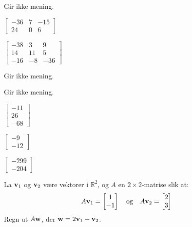 \begin{losning}

\begin{punkt}
Gir ikke mening.
\end{punkt}

\begin{punkt}
$\begin{bmatrix}
-36 & 7 & -15\\
24 & 0 & 6
\end{bmatrix}$
\end{punkt}

\begin{punkt}
$\begin{bmatrix}
-38 & 3 & 9\\
14 & 11 & 5\\
-16 & -8 & -36
\end{bmatrix}$
\end{punkt}

\begin{punkt}
Gir ikke mening.
\end{punkt}

\begin{punkt}
Gir ikke mening.
\end{punkt}

\begin{punkt}
$\begin{bmatrix}
-11\\
26\\
-68
\end{bmatrix}$
\end{punkt}


\begin{punkt}
$\begin{bmatrix}
-9\\
-12
\end{bmatrix}$
\end{punkt}


\begin{punkt}
$\begin{bmatrix}
-299\\
-204
\end{bmatrix}$
\end{punkt}

\end{losning}

\begin{oppgave}
La $\mathbf{v}_1$ og $\mathbf{v}_2$ være vektorer i $\mathbb{R}^2$, og $A$ en
$2 \times 2$-matrise slik at:
\[
A\mathbf{v}_1=\begin{bmatrix} 1 \\ -1 \end{bmatrix}
\quad\text{og}\quad
A\mathbf{v}_2=\begin{bmatrix} 2 \\ 3 \end{bmatrix}
\]
Regn ut $A\mathbf{w}$, der $\mathbf{w}=2\mathbf{v}_1-\mathbf{v}_2$.
\end{oppgave}

